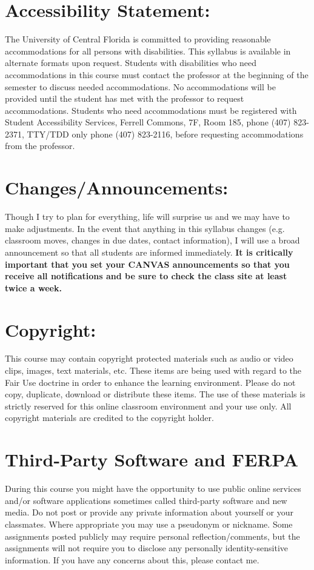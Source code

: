 \documentclass[paper=letter, fontsize=12pt]{article}
\begin{document}
\section{Accessibility Statement:}
The University of Central Florida is committed to providing reasonable accommodations for all persons with disabilities. This syllabus is available in alternate formats upon request. Students with disabilities who need accommodations in this course must contact the professor at the beginning of the semester to discuss needed accommodations. No accommodations will be provided until the student has met with the professor to request accommodations. Students who need accommodations must be registered with Student Accessibility Services, Ferrell Commons, 7F, Room 185, phone (407) 823-2371, TTY/TDD only phone (407) 823-2116, before requesting accommodations from the professor.

\section{Changes/Announcements:}
Though I try to plan for everything, life will surprise us and we may have to make adjustments. In the event that anything in this syllabus changes (e.g. classroom moves, changes in due dates, contact information), I will use a broad announcement so that all students are informed immediately.\textbf{ It is critically important that you set your CANVAS announcements so that you receive all notifications and be sure to check the class site at least twice a week.}

\section{Copyright:}
This course may contain copyright protected materials such as audio or video clips, images, text materials, etc. These items are being used with regard to the Fair Use doctrine in order to enhance the learning environment. Please do not copy, duplicate, download or distribute these items. The use of these materials is strictly reserved for this online classroom environment and your use only. All copyright materials are credited to the copyright holder.

\section{Third-Party Software and FERPA}
During this course you might have the opportunity to use public online services and/or software applications sometimes called third-party software and new media. Do not post or provide any private information about yourself or your classmates. Where appropriate you may use a pseudonym or nickname. Some assignments posted publicly may require personal reflection/comments, but the assignments will not require you to disclose any personally identity-sensitive information. If you have any concerns about this, please contact me.


\end{document}
